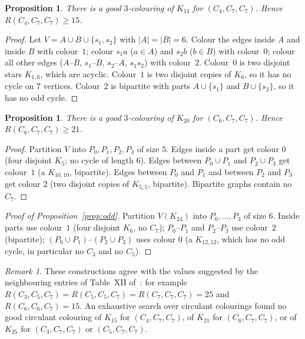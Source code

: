 \documentclass[11pt]{amsart}
\newtheorem{proposition}[theorem]{Proposition}
\theoremstyle{definition}
\theoremstyle{remark}
\newtheorem{remark}[theorem]{Remark}
\begin{document}
\begin{proposition}\label{prop:lb4}
There is a good $3$-colouring of $K_{14}$ for $(C_4,C_7,C_7)$. Hence $R(C_4,C_7,C_7)\ge15$.
\end{proposition}
\begin{proof}
Let $V=A\cup B\cup\{s_1,s_2\}$ with $|A|=|B|=6$. Colour the edges inside $A$ and inside $B$ with colour~$1$; colour $s_1a$ ($a\in A$)
and $s_2b$ ($b\in B$) with colour~$0$; colour all other edges ($A$--$B$, $s_1$--$B$, $s_2$--$A$, $s_1s_2$) with colour~$2$.
Colour~$0$ is two disjoint stars $K_{1,6}$, which are acyclic. Colour~$1$ is two disjoint copies of $K_6$, so it has no cycle on $7$
vertices. Colour~$2$ is bipartite with parts $A\cup\{s_1\}$ and $B\cup\{s_2\}$, so it has no odd cycle.
\end{proof}

\begin{proposition}\label{prop:lb6}
There is a good $3$-colouring of $K_{20}$ for $(C_6,C_7,C_7)$. Hence $R(C_6,C_7,C_7)\ge21$.
\end{proposition}
\begin{proof}
Partition $V$ into $P_0,P_1,P_2,P_3$ of size $5$. Edges inside a part get colour $0$ (four disjoint $K_5$; no cycle of length
$6$). Edges between $P_0\cup P_1$ and $P_2\cup P_3$ get colour~$1$ (a $K_{10,10}$, bipartite). Edges between $P_0$ and $P_1$ and between $P_2$
and $P_3$ get colour $2$ (two disjoint copies of $K_{5,5}$, bipartite). Bipartite graphs contain no $C_7$.
\end{proof}

\begin{proof}[Proof of Proposition~\ref{prop:odd}]
Partition $V(K_{24})$ into $P_0,\dots,P_3$ of size $6$. Inside parts use colour~$1$ (four disjoint $K_6$, no $C_7$);
$P_0$--$P_1$ and $P_2$--$P_3$ use colour~$2$ (bipartite); $(P_0\cup P_1)$--$(P_2\cup P_3)$ uses colour $0$ (a $K_{12,12}$, which has
no odd cycle, in particular no $C_3$ and no $C_5$).
\end{proof}

\begin{remark}
These constructions agree with the values suggested by the neighbouring entries of Table~XII of~\cite{Rad}: for example
$R(C_3,C_5,C_7)=R(C_5,C_5,C_7)=R(C_7,C_7,C_7)=25$ and $R(C_6,C_6,C_7)=15$. An exhaustive search over circulant colourings found no
good circulant colouring of $K_{15}$ for $(C_4,C_7,C_7)$, of $K_{21}$ for $(C_6,C_7,C_7)$, or of $K_{25}$ for $(C_3,C_7,C_7)$ or
$(C_5,C_7,C_7)$.
\end{remark}
\end{document}
